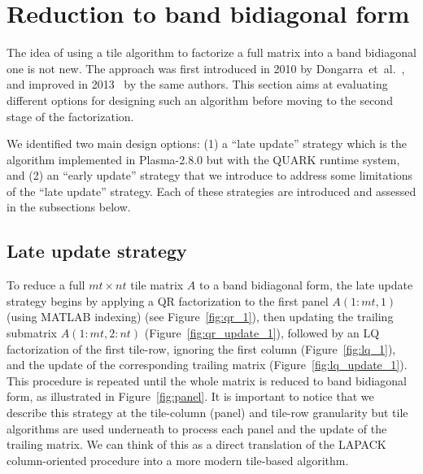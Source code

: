 \section{Reduction  to band bidiagonal form}
\label{sec:band}
The idea of using a tile algorithm to factorize a full matrix into a
band bidiagonal one is not new.  The approach was first introduced in
2010 by Dongarra~et~al\@.~\cite{ltaief2010parallel}, and improved in
2013~\cite{haidar2013improved} by the same authors.  This section aims
at evaluating different options for designing such an algorithm before
moving to the second stage of the factorization.

We identified two main design options: (1) a ``late update'' strategy
which is the algorithm implemented in Plasma-2.8.0 but with the QUARK
runtime system, and (2) an ``early update'' strategy that we introduce
to address some limitations of the ``late update'' strategy.  Each of
these strategies are introduced and assessed in the subsections below.

\subsection{Late update strategy}
To reduce a full $mt \times nt$ tile matrix $A$ to a band bidiagonal
form, the late update strategy begins by applying a QR factorization
to the first panel $A(1:mt,1)$ (using MATLAB indexing) (see
Figure~\ref{fig:qr_1}), then updating the trailing submatrix
$A(1:mt,2:nt)$ (Figure~\ref{fig:qr_update_1}), followed by an LQ
factorization of the first tile-row, ignoring the first column
(Figure~\ref{fig:lq_1}), and the update of the corresponding trailing
matrix (Figure~\ref{fig:lq_update_1}).  This procedure is repeated
until the whole matrix is reduced to band bidiagonal form, as
illustrated in Figure~\ref{fig:panel}.  It is important to notice that
we describe this strategy at the tile-column (panel) and tile-row
granularity but tile algorithms are used underneath to process each
panel and the update of the trailing matrix.  We can think of this as
a direct translation of the LAPACK column-oriented procedure into a
more modern tile-based algorithm.

